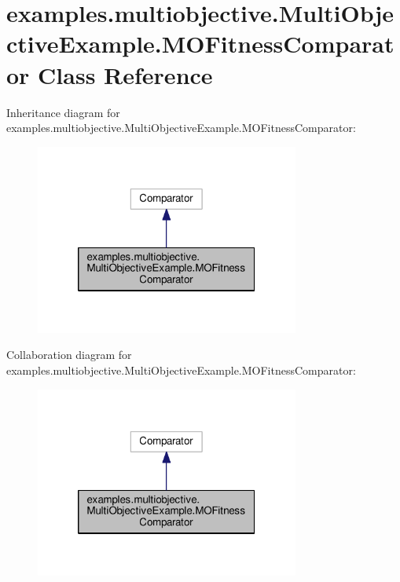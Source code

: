 \hypertarget{classexamples_1_1multiobjective_1_1_multi_objective_example_1_1_m_o_fitness_comparator}{\section{examples.\-multiobjective.\-Multi\-Objective\-Example.\-M\-O\-Fitness\-Comparator Class Reference}
\label{classexamples_1_1multiobjective_1_1_multi_objective_example_1_1_m_o_fitness_comparator}
}


Inheritance diagram for examples.\-multiobjective.\-Multi\-Objective\-Example.\-M\-O\-Fitness\-Comparator\-:
\nopagebreak
\begin{figure}[H]
\begin{center}
\leavevmode
\includegraphics[width=246pt]{classexamples_1_1multiobjective_1_1_multi_objective_example_1_1_m_o_fitness_comparator__inherit__graph}
\end{center}
\end{figure}


Collaboration diagram for examples.\-multiobjective.\-Multi\-Objective\-Example.\-M\-O\-Fitness\-Comparator\-:
\nopagebreak
\begin{figure}[H]
\begin{center}
\leavevmode
\includegraphics[width=246pt]{classexamples_1_1multiobjective_1_1_multi_objective_example_1_1_m_o_fitness_comparator__coll__graph}
\end{center}
\end{figure}

